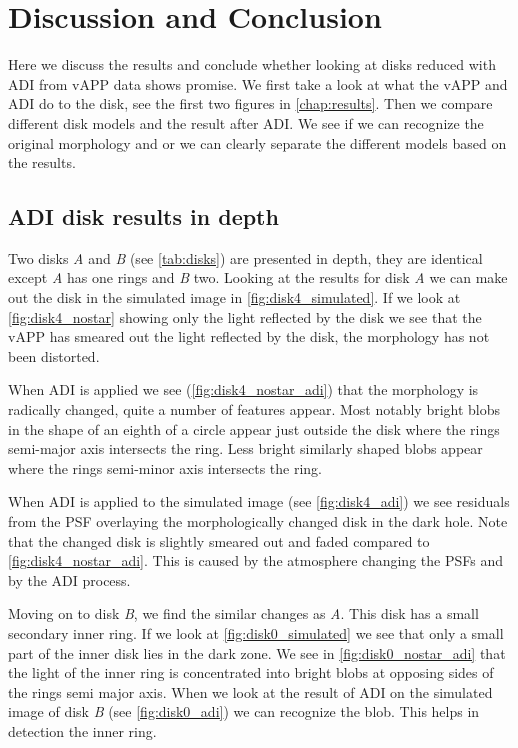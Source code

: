 \chapter{Discussion and Conclusion}

Here we discuss the results and conclude whether looking at disks reduced with \ac{ADI} from \ac{vAPP} data shows promise. We first take a look at what the \ac{vAPP} and \ac{ADI} do to the disk, see the first two figures in \autoref{chap:results}. Then we compare different disk models and the result after \ac{ADI}. We see if we can recognize the original morphology and or we can clearly separate the different models based on the results. 

\section{ADI disk results in depth}
\label{sec:adi_res}
Two disks \textit{A} and \textit{B} (see \autoref{tab:disks}) are presented in depth, they are identical except \textit{A} has one rings and \textit{B} two. Looking at the results for disk \textit{A} we can make out the disk in the simulated image in \autoref{fig:disk4_simulated}. If we look at \autoref{fig:disk4_nostar} showing only the light reflected by the disk we see that the \ac{vAPP} has smeared out the light reflected by the disk, the morphology has not been distorted. 

When \ac{ADI} is applied we see (\autoref{fig:disk4_nostar_adi}) that the morphology is radically changed, quite a number of features appear. Most notably bright blobs in the shape of an eighth of a circle appear just outside the disk where the rings semi-major axis intersects the ring. Less bright similarly shaped blobs appear where the rings semi-minor axis intersects the ring.

When \ac{ADI} is applied to the simulated image (see \autoref{fig:disk4_adi}) we see residuals from the \ac{PSF} overlaying the morphologically changed disk in the dark hole. Note that the changed disk is slightly smeared out and faded compared to \autoref{fig:disk4_nostar_adi}. This is caused by the atmosphere changing the \acp{PSF} and by the \ac{ADI} process.

Moving on to disk \textit{B}, we find the similar changes as \textit{A}. This disk has a small secondary inner ring. If we look at \autoref{fig:disk0_simulated} we see that only a small part of the inner disk lies in the dark zone. We see in \autoref{fig:disk0_nostar_adi} that the light of the inner ring is concentrated into bright blobs at opposing sides of the rings semi major axis. When we look at the result of \ac{ADI} on the simulated image of disk \textit{B} (see \autoref{fig:disk0_adi}) we can recognize the blob. This helps in detection the inner ring.

